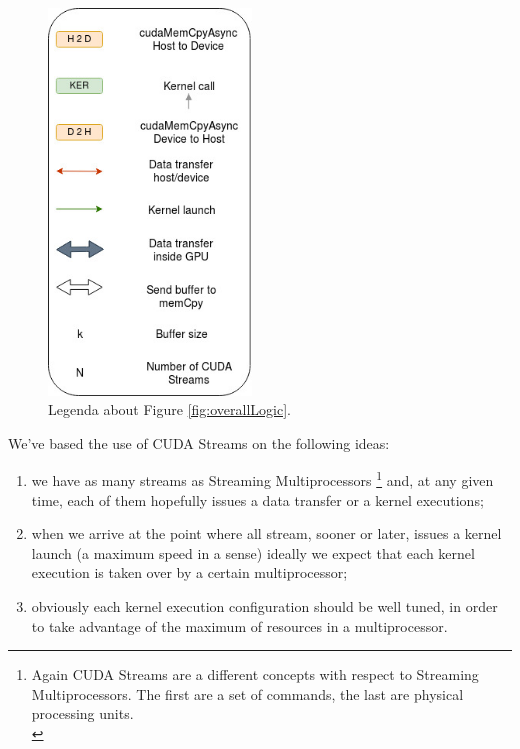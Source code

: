 		
		\begin{figure}
			\raggedleft
				\includegraphics[width=0.48\textwidth]{images/logicLegenda.jpg}
			\caption{Legenda about Figure \ref{fig:overallLogic}.}
		\end{figure}
				
				
	
	
	We've based the use of CUDA Streams on the following ideas:
	\begin{enumerate}
		\item we have as many streams as Streaming Multiprocessors \footnote{Again CUDA Streams are a different concepts with respect to Streaming Multiprocessors. The first are a set of commands, the last are physical processing units.\\} and, at any given time, each of them hopefully issues a data transfer or a kernel executions;
		\item when we arrive at the point where all stream, sooner or later, issues a kernel launch (a maximum speed in a sense) ideally we expect that each kernel execution is taken over by a certain multiprocessor;
		\item obviously each kernel execution configuration should be well tuned, in order to take advantage of the maximum of resources in a multiprocessor. 
	\end{enumerate}
	
